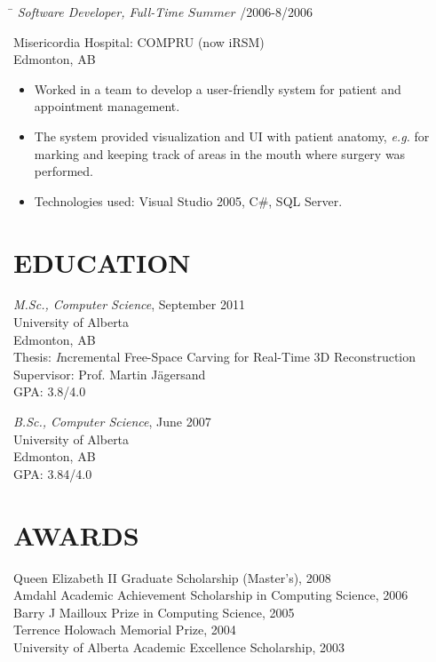 \documentclass{res}
\begin{document}
\begin{resume}
    \vspace{-0.1in}
    \begin{tabbing}
    \hspace{5.15in}\= \kill  %
    \textit{Software Developer, Full-Time \(Summer\)} /2006-8/2006
    \end{tabbing}\vspace{-22pt}  %
    Misericordia Hospital: COMPRU (now iRSM)\\
    Edmonton, AB\\
    \vspace{-2.5ex}\begin{itemize}[noitemsep]
    \item Worked in a team to develop a user-friendly system for patient and appointment management.
    \item The system provided visualization and UI with patient anatomy, \textit{e.g.} for marking and keeping track of areas in the mouth where surgery was performed.
    \item Technologies used: Visual Studio 2005, C\#, SQL Server.
    \end{itemize}


\section{EDUCATION}
    \textit{M.Sc., Computer Science}, September 2011\\
    University of Alberta\\
    Edmonton, AB\\
    \hspace*{2.5em} Thesis: {\textit Incremental Free-Space Carving for Real-Time 3D Reconstruction}\\
    \hspace*{2.5em} Supervisor: Prof. Martin J{\"a}gersand\\
    \hspace*{2.5em} GPA: 3.8/4.0

    \textit{B.Sc., Computer Science}, June 2007\\
    University of Alberta\\
    Edmonton, AB\\
    \hspace*{2.5em} GPA: 3.84/4.0


\section{AWARDS}
    Queen Elizabeth II Graduate Scholarship (Master's), 2008\\
    Amdahl Academic Achievement Scholarship in Computing Science, 2006\\
    Barry J Mailloux Prize in Computing Science, 2005\\
    Terrence Holowach Memorial Prize, 2004\\
    University of Alberta Academic Excellence Scholarship, 2003



\end{resume}
\end{document}
